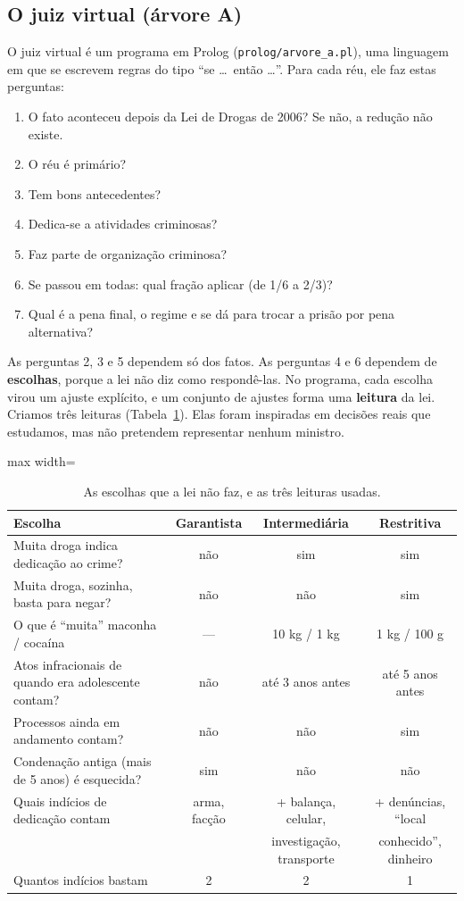 \subsection*{O juiz virtual (árvore A)}

O juiz virtual é um programa em Prolog (\texttt{prolog/arvore\_a.pl}), uma linguagem em que se
escrevem regras do tipo ``se \ldots\ então \ldots''. Para cada réu, ele faz estas perguntas:
\begin{enumerate}
  \item O fato aconteceu depois da Lei de Drogas de 2006? Se não, a redução não existe.
  \item O réu é primário?
  \item Tem bons antecedentes?
  \item Dedica-se a atividades criminosas?
  \item Faz parte de organização criminosa?
  \item Se passou em todas: qual fração aplicar (de 1/6 a 2/3)?
  \item Qual é a pena final, o regime e se dá para trocar a prisão por pena alternativa?
\end{enumerate}
As perguntas 2, 3 e 5 dependem só dos fatos. As perguntas 4 e 6 dependem de
\textbf{escolhas}, porque a lei não diz como respondê-las. No programa, cada escolha virou
um ajuste explícito, e um conjunto de ajustes forma uma \textbf{leitura} da lei.
Criamos três leituras (Tabela~\ref{tab:perfis}). Elas foram inspiradas em decisões reais
que estudamos, mas não pretendem representar nenhum ministro.

\begin{table}[h]
\centering\small
\caption{As escolhas que a lei não faz, e as três leituras usadas.}
\label{tab:perfis}
\begin{adjustbox}{max width=\textwidth}
\begin{tabular}{lccc}
\toprule
Escolha & Garantista & Intermediária & Restritiva \\
\midrule
Muita droga indica dedicação ao crime? & não & sim & sim \\
Muita droga, sozinha, basta para negar? & não & não & sim \\
O que é ``muita'' maconha / cocaína & --- & 10 kg / 1 kg & 1 kg / 100 g \\
Atos infracionais de quando era adolescente contam? & não & até 3 anos antes & até 5 anos antes \\
Processos ainda em andamento contam? & não & não & sim \\
Condenação antiga (mais de 5 anos) é esquecida? & sim & não & não \\
Quais indícios de dedicação contam & arma, facção & + balança, celular, & + denúncias, ``local \\
 & & investigação, transporte & conhecido'', dinheiro \\
Quantos indícios bastam & 2 & 2 & 1 \\
\bottomrule
\end{tabular}
\end{adjustbox}
\end{table}

